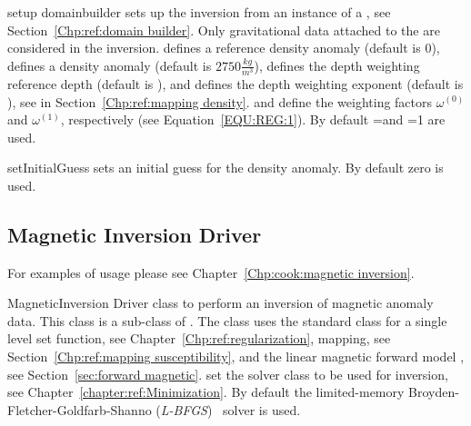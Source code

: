 \begin{methoddesc}[GravityInversion]{setup}{
domainbuilder
}
sets up the inversion from an instance  of a , see Section~\ref{Chp:ref:domain builder}.
Only gravitational data attached to the  are considered in the inversion.
 defines a reference density anomaly (default is 0), 
 defines a density anomaly (default is $2750 \frac{kg}{m^3}$),
 defines the depth weighting reference depth (default is \None), and
 defines the depth weighting exponent (default is \None),
see  in Section~\ref{Chp:ref:mapping density}.
 and  define the weighting factors
$\omega^{(0)}$ and
$\omega^{(1)}$, respectively (see Equation~\ref{EQU:REG:1}).
By default =\None and =1 are used.
\end{methoddesc}

\begin{methoddesc}[GravityInversion]{setInitialGuess}{}
sets an initial guess for the density anomaly. By default zero is used.
\end{methoddesc}

\subsection{Magnetic Inversion Driver}
For examples of usage please see Chapter~\ref{Chp:cook:magnetic inversion}.

\begin{classdesc}{MagneticInversion}{}
Driver class to perform an inversion of magnetic anomaly data. This class
is a sub-class of . The class uses the standard
 class for a single level set function, see Chapter~\ref{Chp:ref:regularization},
 mapping, see Section~\ref{Chp:ref:mapping susceptibility}, and the linear
magnetic forward model , see Section~\ref{sec:forward magnetic}.
 set the solver class to be used for inversion,
see Chapter~\ref{chapter:ref:Minimization}.
 By default the limited-memory Broyden-Fletcher-Goldfarb-Shanno (\emph{L-BFGS})~\cite{Nocedal1980} solver is used.
\end{classdesc}



